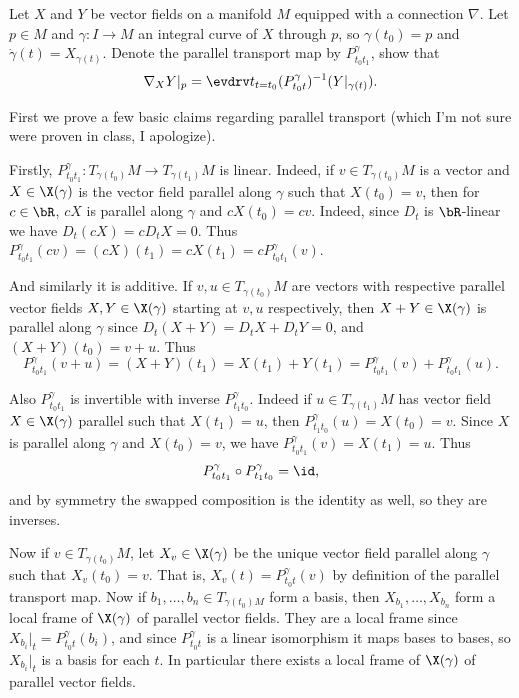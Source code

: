\bprob[title={DoCarmo, Riemannian Geometry page 56 question 2}]

    Let $X$ and $Y$ be vector fields on a manifold $M$ equipped with a connection $\nabla$.
    Let $p\in M$ and $\gamma\colon I\to M$ an integral curve of $X$ through $p$, so $\gamma(t_0)=p$ and $\dot\gamma(t)=X_{\gamma(t)}$.
    Denote the parallel transport map by $P^\gamma_{t_0t_1}$, show that
    $$ \nabla_XY|_p = \evdrv t_{t=t_0}(P^\gamma_{t_0t})^{-1}(Y|_{\gamma(t)}) . $$

\eprob

First we prove a few basic claims regarding parallel transport (which I'm not sure were proven in class, I apologize).

Firstly, $P^\gamma_{t_0t_1}\colon T_{\gamma(t_0)}M\to T_{\gamma(t_1)}M$ is linear.
Indeed, if $v\in T_{\gamma(t_0)}M$ is a vector and $X\in\X(\gamma)$ is the vector field parallel along $\gamma$ such that $X(t_0)=v$, then for $c\in\bR$,
$cX$ is parallel along $\gamma$ and $cX(t_0)=cv$.
Indeed, since $D_t$ is $\bR$-linear we have $D_t(cX)=cD_tX=0$.
Thus $P^\gamma_{t_0t_1}(cv)=(cX)(t_1)=cX(t_1)=cP^\gamma_{t_0t_1}(v)$.

And similarly it is additive.
If $v,u\in T_{\gamma(t_0)}M$ are vectors with respective parallel vector fields $X,Y\in\X(\gamma)$ starting at $v,u$ respectively, then $X+Y\in\X(\gamma)$
is parallel along $\gamma$ since $D_t(X+Y)=D_tX+D_tY=0$, and $(X+Y)(t_0)=v+u$.
Thus
$$ P^\gamma_{t_0t_1}(v+u) = (X+Y)(t_1) = X(t_1) + Y(t_1) = P^\gamma_{t_0t_1}(v) + P^\gamma_{t_0t_1}(u) . $$

Also $P^\gamma_{t_0t_1}$ is invertible with inverse $P^\gamma_{t_1t_0}$.
Indeed if $u\in T_{\gamma(t_1)}M$ has vector field $X\in\X(\gamma)$ parallel such that $X(t_1)=u$, then $P^\gamma_{t_1t_0}(u)=X(t_0)=v$.
Since $X$ is parallel along $\gamma$ and $X(t_0)=v$, we have $P^\gamma_{t_0t_1}(v)=X(t_1)=u$.
Thus
$$ P^\gamma_{t_0t_1} \circ P^\gamma_{t_1t_0} = \id , $$
and by symmetry the swapped composition is the identity as well, so they are inverses.

Now if $v\in T_{\gamma(t_0)}M$, let $X_v\in\X(\gamma)$ be the unique vector field parallel along $\gamma$ such that $X_v(t_0)=v$.
That is, $X_v(t)=P^\gamma_{t_0t}(v)$ by definition of the parallel transport map.
Now if $b_1,\dots,b_n\in T_{\gamma(t_0)M}$ form a basis, then $X_{b_1},\dots,X_{b_n}$ form a local frame of $\X(\gamma)$ of parallel vector fields.
They are a local frame since $X_{b_i}|_t=P^\gamma_{t_0t}(b_i)$, and since $P^\gamma_{t_0t}$ is a linear isomorphism it maps bases to bases, so $X_{b_i}|_t$ is a basis for each $t$.
In particular there exists a local frame of $\X(\gamma)$ of parallel vector fields.

